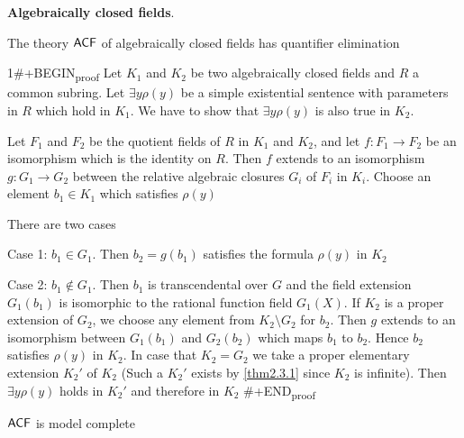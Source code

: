 \documentclass[11pt]{article}
\begin{document}
\textbf{Algebraically closed fields}.
\begin{theorem}[Tarski]
The theory \(\operatorname{\textsf{ACF}}\) of algebraically closed fields has quantifier elimination
\end{theorem}

1\#+BEGIN\textsubscript{proof}
Let \(K_1\) and \(K_2\) be two algebraically closed fields and \(R\) a common
subring.
Let \(\exists y\rho(y)\) be a simple existential sentence with
parameters in \(R\) which hold in \(K_1\). We have to show that \(\exists y\rho(y)\) is also true in \(K_2\).

Let \(F_1\) and \(F_2\) be the quotient fields of \(R\) in \(K_1\) and
\(K_2\), and let \(f:F_1\to F_2\) be an isomorphism which is the identity on
\(R\). Then \(f\) extends to an isomorphism \(g:G_1\to G_2\) between the
relative algebraic closures \(G_i\) of \(F_i\) in \(K_i\). Choose an element \(b_1\in K_1\) which
satisfies \(\rho(y)\)

\begin{center}\end{center}
There are two cases

Case 1: \(b_1\in G_1\). Then \(b_2=g(b_1)\) satisfies the formula \(\rho(y)\) in \(K_2\)

Case 2: \(b_1\not\in G_1\). Then \(b_1\) is transcendental over \(G\) and the field
extension \(G_1(b_1)\) is isomorphic to the rational function field \(G_1(X)\). If \(K_2\) is a
proper extension of \(G_2\), we choose any element from \(K_2\setminus G_2\) for \(b_2\). Then \(g\) extends
to an isomorphism between \(G_1(b_1)\) and \(G_2(b_2)\) which maps \(b_1\) to \(b_2\). Hence \(b_2\)
satisfies \(\rho(y)\) in \(K_2\). In case that \(K_2=G_2\) we take a proper elementary
extension \(K_2'\) of \(K_2\) (Such a \(K_2'\) exists by \ref{thm2.3.1} since \(K_2\) is infinite).
Then \(\exists y\rho(y)\) holds in \(K_2'\) and therefore in \(K_2\)
\#+END\textsubscript{proof}

\begin{corollary}[]
\(\textsf{ACF}\) is model complete
\end{corollary}
\end{document}
